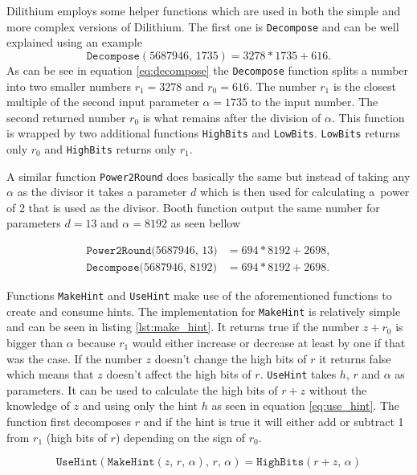 Dilithium employs some helper functions which are used in both the simple and more complex versions of Dilithium. The first one is \texttt{Decompose} and can be well explained using an example
\begin{equation}
  \label{eq:decompose}
  \mathrm{\texttt{Decompose}}(5687946,\,1735)=3278*1735+616.
\end{equation}
\noindent As can be see in equation \ref{eq:decompose} the \texttt{Decompose} function splits a number into two smaller numbers $r_1=3278$ and $r_0=616$. The number $r_1$ is the closest multiple of the second input parameter $\alpha=1735$ to the input number. The second returned number $r_0$ is what remains after the division of $\alpha$. This function is wrapped by two additional functions \texttt{HighBits} and \texttt{LowBits}. \texttt{LowBits} returns only $r_0$ and \texttt{HighBits} returns only $r_1$.

A similar function \texttt{Power2Round} does basically the same but instead of taking any $\alpha$ as the divisor it takes a parameter $d$ which is then used for calculating a~power of 2 that is used as the divisor. Booth function output the same number for parameters $d=13$ and $\alpha=8192$ as seen bellow

\begin{align}
  \mathrm{\texttt{Power2Round}}(5687946,\,13\mathrm)&=694*8192+2698, \\
  \mathrm{\texttt{Decompose}}(5687946,\,8192\mathrm)&=694*8192+2698.
\end{align}

Functions \texttt{MakeHint} and \texttt{UseHint} make use of the aforementioned functions to create and consume hints. The implementation for \texttt{MakeHint} is relatively simple and can be seen in listing \ref{lst:make_hint}. It returns true if the number $z+r_0$ is bigger than $\alpha$ because $r_1$ would either increase or decrease at least by one if that was the case. If the number $z$ doesn't change the high bits of $r$ it returns false which means that $z$ doesn't affect the high bits of $r$.
\noindent\texttt{UseHint} takes $h$, $r$ and $\alpha$ as parameters. It can be used to calculate the high bits of $r+z$ without the knowledge of $z$ and using only the hint $h$ as seen in equation \ref{eq:use_hint}. The function first decomposes $r$ and if the hint is true it will either add or subtract 1 from $r_1$ (high bits of $r$) depending on the sign of $r_0$.

\begin{equation}
  \label{eq:use_hint}
  \mathrm{\texttt{UseHint}}(\mathrm{\texttt{MakeHint}}(z,\,r,\,\alpha),\,r,\,\alpha)=\mathrm{\texttt{HighBits}}(r+z,\,\alpha)
\end{equation}
